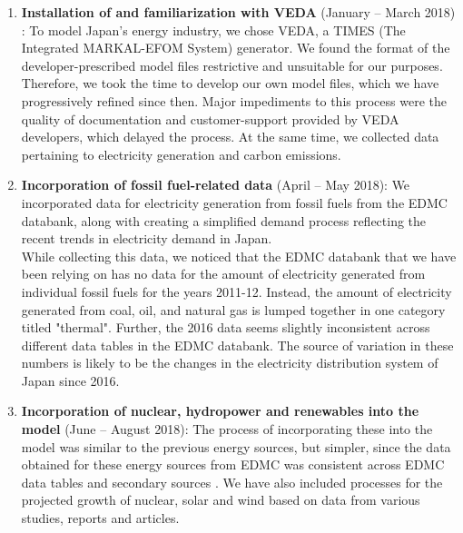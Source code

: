 \documentclass[14pt,a4paper]{article} %
\begin{document}
\begin{enumerate}
\item \textbf{Installation of and familiarization with VEDA} (January – March 2018) : To model Japan's energy industry, we chose VEDA, a TIMES (The Integrated MARKAL-EFOM System) \cite{loulou_documentation_2005} \cite{gargiulo_documentation_2005} generator. We found the format of the developer-prescribed model files restrictive and unsuitable for our purposes. Therefore, we took the time to develop our own model files, which we have progressively refined since then. Major impediments to this process were the quality of documentation and customer-support provided by VEDA developers, which delayed the process.
At the same time, we collected data pertaining to electricity generation and carbon emissions.

\item \textbf{Incorporation of fossil fuel-related data} (April – May 2018): We incorporated data for electricity generation from fossil fuels from the EDMC databank\cite{noauthor_energy_2018}, along with creating a simplified demand process reflecting the recent trends in electricity demand in Japan. \\

While collecting this data, we noticed that the EDMC databank that we have been relying on has no data for the amount of electricity generated from individual fossil fuels for the years 2011-12. Instead, the amount of electricity generated from coal, oil, and natural gas is lumped together in one category titled "thermal". Further, the 2016 data seems slightly inconsistent across different data tables in the EDMC databank. The source of variation in these numbers is likely to be the changes in the electricity distribution system of Japan since 2016.

\item \textbf{Incorporation of nuclear, hydropower and renewables into the model} (June – August 2018): The process of incorporating these into the model was similar to the previous energy sources, but simpler, since the data obtained for these energy sources from EDMC was consistent across EDMC data tables and secondary sources \cite{noauthor_energy_2018} \cite{noauthor_iea_2017} \cite{noauthor_japan_2017}. We have also included processes for the projected growth of nuclear, solar and wind based on data from various studies, reports and articles. \cite{publicover_japan_2017} \cite{dincer_analysis_2011} \cite{noauthor_geothermal_2018} \cite{heger_wind_2016} \cite{noauthor_operational_2013} \cite{noauthor_electricity_2017}


\end{enumerate}
\end{document}
